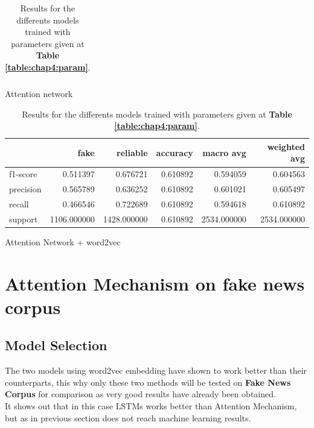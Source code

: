 \begin{table}
\begin{subtable}{\textwidth}
\begin{tabular}{lrrrrr}
\bottomrule
\end{tabular}
\caption{Attention network}
\end{subtable}
\begin{subtable}{\textwidth}
\begin{tabular}{lrrrrr}
\toprule
{} &         fake &     reliable &  accuracy &    macro avg &  weighted avg \\
\midrule
f1-score  &     0.511397 &     0.676721 &  0.610892 &     0.594059 &      0.604563 \\
precision &     0.565789 &     0.636252 &  0.610892 &     0.601021 &      0.605497 \\
recall    &     0.466546 &     0.722689 &  0.610892 &     0.594618 &      0.610892 \\
support   &  1106.000000 &  1428.000000 &  0.610892 &  2534.000000 &   2534.000000 \\
\bottomrule
\end{tabular}
\caption{Attention Network + word2vec}
\end{subtable}
\caption{Results for the differents models trained with parameters given at \textbf{Table \ref{table:chap4:param}}.}
\label{table:chap4:results}
\end{table}
\section{Attention Mechanism on fake news corpus}
\subsection{Model Selection}
The two models using word2vec embedding have shown to work better than their counterparts, this why only these two methods will be tested on \textbf{Fake News Corpus} for comparison as very good results have already been obtained. \\

It shows out that in this case LSTMs works better than Attention Mechanism, but as in previous section does not reach machine learning results. \\

